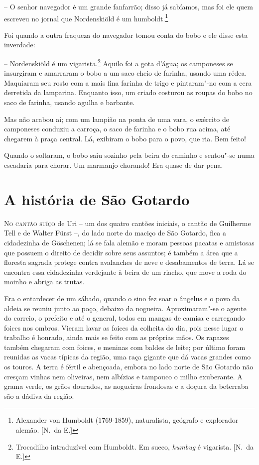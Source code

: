 -- O senhor navegador é um grande fanfarrão; disso já sabíamos, mas foi
ele quem escreveu no jornal que Nordenskiöld é um 
humboldt.\footnote{ Alexander von Humboldt (1769-1859), naturalista, geógrafo
e explorador alemão. [N.~da E.]} 

Foi quando a outra fraqueza do navegador tomou conta 
do bobo e ele disse esta inverdade:

-- Nordenskiöld é um vigarista.\footnote{ Trocadilho intraduzível com
Humboldt. Em sueco, \textit{humbug} é vigarista. [N.~da E.]} Aquilo foi a gota
d’água; os camponeses se insurgiram e amarraram o bobo a um saco cheio
de farinha, usando uma rédea. Maquiaram seu rosto com a mais fina
farinha de trigo e pintaram"-no com a cera derretida da lamparina.
Enquanto isso, um criado costurou as roupas do bobo no saco de farinha,
usando agulha e barbante. 

Mas não acabou aí; com um lampião na ponta de uma vara, o exército de
camponeses conduziu a carroça, o saco de farinha e o bobo rua acima,
até chegarem à praça central. Lá, exibiram o bobo para o povo, que ria.
Bem feito!

Quando o soltaram, o bobo saiu sozinho pela beira do caminho e
sentou"-se numa escadaria para chorar. Um marmanjo chorando! Era quase
de dar pena.

\chapter{A história de São Gotardo}


\textsc{No cantão suíço} de Uri -- um dos quatro cantões iniciais, o cantão de
Guilherme Tell e de Walter Fürst --, do lado norte do maciço de São
Gotardo, fica a cidadezinha de Göschenen; lá se fala alemão e moram
pessoas pacatas e amistosas que possuem o direito de decidir sobre seus
assuntos; é também a área que a floresta sagrada protege contra
avalanches de neve e desabamentos de terra. Lá se encontra essa
cidadezinha verdejante à beira de um riacho, que move a roda do moinho
e abriga as trutas. 

Era o entardecer de um sábado, quando o sino fez soar o ângelus e o povo
da aldeia se reuniu junto ao poço, debaixo da nogueira.
Aproximaram"-se o agente do correio, o prefeito e até o general, todos
em mangas de camisa e carregando foices nos ombros. Vieram lavar as
foices da colheita do dia, pois nesse lugar o trabalho é honrado, ainda
mais se feito com as próprias mãos. Os rapazes também chegaram com
foices, e meninas com baldes de leite; por último foram reunidas as
vacas típicas da região, uma raça gigante que dá vacas grandes como os
touros. A terra é fértil e abençoada, embora no lado norte de São
Gotardo não cresçam vinhas nem oliveiras, nem albízias e tampouco o
milho exuberante. A grama verde, os grãos dourados, as nogueiras
frondosas e a doçura da beterraba são a dádiva da região.

